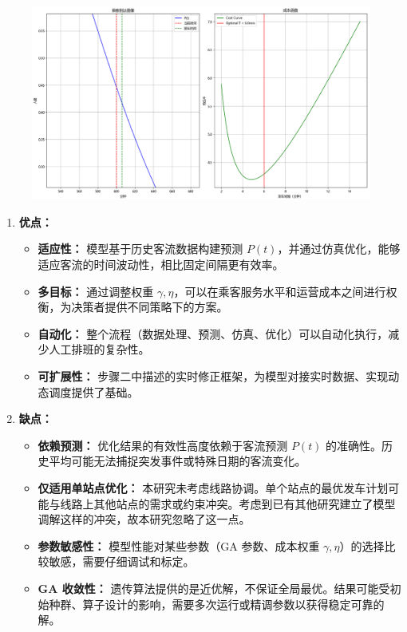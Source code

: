 \begin{figure}[htbp]
    \centering
    \includegraphics[width=1.0\textwidth]{res/Figure_8.png}
    \label{fig:gaBuji2}
\end{figure}


\begin{enumerate}
    \item \textbf{优点：}
        \begin{itemize}
            \item \textbf{适应性：} 模型基于历史客流数据构建预测 $P(t)$，并通过仿真优化，能够适应客流的时间波动性，相比固定间隔更有效率。
            \item \textbf{多目标：} 通过调整权重 $\gamma, \eta$，可以在乘客服务水平和运营成本之间进行权衡，为决策者提供不同策略下的方案。
            \item \textbf{自动化：} 整个流程（数据处理、预测、仿真、优化）可以自动化执行，减少人工排班的复杂性。
            \item \textbf{可扩展性：} 步骤二中描述的实时修正框架，为模型对接实时数据、实现动态调度提供了基础。
        \end{itemize}
    \item \textbf{缺点：}
        \begin{itemize}
            \item \textbf{依赖预测：} 优化结果的有效性高度依赖于客流预测 $P(t)$ 的准确性。历史平均可能无法捕捉突发事件或特殊日期的客流变化。
            \item \textbf{仅适用单站点优化：} 本研究未考虑线路协调。单个站点的最优发车计划可能与线路上其他站点的需求或约束冲突。考虑到已有其他研究建立了模型调解这样的冲突，故本研究忽略了这一点。
            \item \textbf{参数敏感性：} 模型性能对某些参数（GA 参数、成本权重 $\gamma, \eta$）的选择比较敏感，需要仔细调试和标定。
            \item \textbf{GA 收敛性：} 遗传算法提供的是近优解，不保证全局最优。结果可能受初始种群、算子设计的影响，需要多次运行或精调参数以获得稳定可靠的解。
        \end{itemize}
\end{enumerate}

